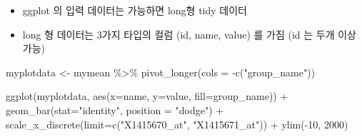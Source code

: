 \documentclass[
]{book}
\newenvironment{Shaded}{\begin{snugshade}}{\end{snugshade}}
\newcommand{\AttributeTok}[1]{\textcolor[rgb]{0.77,0.63,0.00}{#1}}
\newcommand{\DecValTok}[1]{\textcolor[rgb]{0.00,0.00,0.81}{#1}}
\newcommand{\FunctionTok}[1]{\textcolor[rgb]{0.00,0.00,0.00}{#1}}
\newcommand{\NormalTok}[1]{#1}
\newcommand{\OtherTok}[1]{\textcolor[rgb]{0.56,0.35,0.01}{#1}}
\newcommand{\SpecialCharTok}[1]{\textcolor[rgb]{0.00,0.00,0.00}{#1}}
\newcommand{\StringTok}[1]{\textcolor[rgb]{0.31,0.60,0.02}{#1}}
\providecommand{\tightlist}{%
  \setlength{\itemsep}{0pt}\setlength{\parskip}{0pt}}
\begin{document}
\begin{Shaded}
\end{Shaded}

\begin{itemize}
\tightlist
\item
  ggplot 의 입력 데이터는 가능하면 long형 tidy 데이터
\item
  long 형 데이터는 3가지 타입의 컬럼 (id, name, value) 를 가짐 (id 는 두개 이상 가능)
\end{itemize}

\begin{Shaded}
\begin{Highlighting}[]
\NormalTok{myplotdata }\OtherTok{\textless{}{-}}\NormalTok{ mymean }\SpecialCharTok{\%\textgreater{}\%} 
  \FunctionTok{pivot\_longer}\NormalTok{(}\AttributeTok{cols =} \SpecialCharTok{{-}}\FunctionTok{c}\NormalTok{(}\StringTok{"group\_name"}\NormalTok{))}
  
\FunctionTok{ggplot}\NormalTok{(myplotdata, }\FunctionTok{aes}\NormalTok{(}\AttributeTok{x=}\NormalTok{name, }\AttributeTok{y=}\NormalTok{value, }\AttributeTok{fill=}\NormalTok{group\_name)) }\SpecialCharTok{+}
  \FunctionTok{geom\_bar}\NormalTok{(}\AttributeTok{stat=}\StringTok{"identity"}\NormalTok{, }\AttributeTok{position =} \StringTok{"dodge"}\NormalTok{) }\SpecialCharTok{+}
  \FunctionTok{scale\_x\_discrete}\NormalTok{(}\AttributeTok{limit=}\FunctionTok{c}\NormalTok{(}\StringTok{"X1415670\_at"}\NormalTok{, }\StringTok{"X1415671\_at"}\NormalTok{)) }\SpecialCharTok{+}
  \FunctionTok{ylim}\NormalTok{(}\SpecialCharTok{{-}}\DecValTok{10}\NormalTok{, }\DecValTok{2000}\NormalTok{)}
\end{Highlighting}
\end{Shaded}
\end{document}

